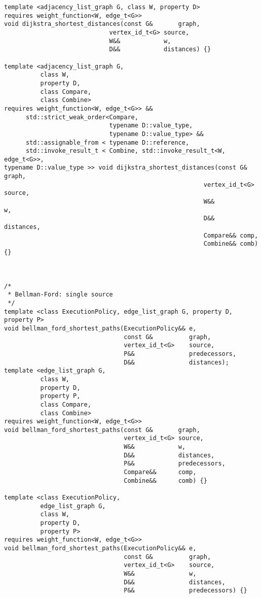 \begin{lstlisting}
template <adjacency_list_graph G, class W, property D>
requires weight_function<W, edge_t<G>>
void dijkstra_shortest_distances(const G&       graph,
                             vertex_id_t<G> source,
                             W&&            w,
                             D&&            distances) {}

template <adjacency_list_graph G,
          class W,
          property D,
          class Compare,
          class Combine>
requires weight_function<W, edge_t<G>> &&
      std::strict_weak_order<Compare,
                             typename D::value_type,
                             typename D::value_type> &&
      std::assignable_from < typename D::reference,
      std::invoke_result_t < Combine, std::invoke_result_t<W, edge_t<G>>,
typename D::value_type >> void dijkstra_shortest_distances(const G&       graph,
                                                       vertex_id_t<G> source,
                                                       W&&            w,
                                                       D&&       distances,
                                                       Compare&& comp,
                                                       Combine&& comb) {}



/*
 * Bellman-Ford: single source
 */
template <class ExecutionPolicy, edge_list_graph G, property D, property P>
void bellman_ford_shortest_paths(ExecutionPolicy&& e,
                                 const G&          graph,
                                 vertex_id_t<G>    source,
                                 P&&               predecessors,
                                 D&&               distances);
template <edge_list_graph G,
          class W,
          property D,
          property P,
          class Compare,
          class Combine>
requires weight_function<W, edge_t<G>>
void bellman_ford_shortest_paths(const G&       graph,
                                 vertex_id_t<G> source,
                                 W&&            w,
                                 D&&            distances,
                                 P&&            predecessors,
                                 Compare&&      comp,
                                 Combine&&      comb) {}

template <class ExecutionPolicy,
          edge_list_graph G,
          class W,
          property D,
          property P>
requires weight_function<W, edge_t<G>>
void bellman_ford_shortest_paths(ExecutionPolicy&& e,
                                 const G&          graph,
                                 vertex_id_t<G>    source,
                                 W&&               w,
                                 D&&               distances,
                                 P&&               predecessors) {}


\end{lstlisting}
